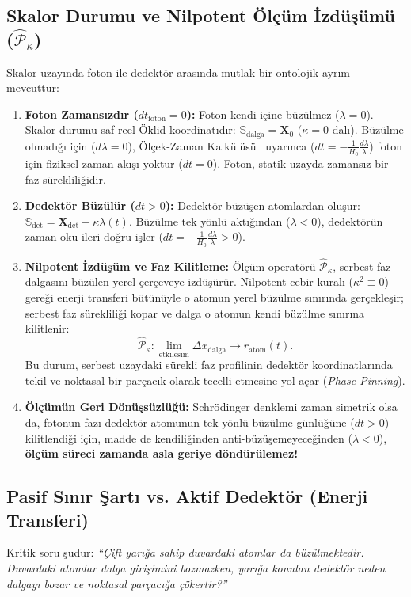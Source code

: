 \documentclass[11pt,a4paper]{article}
\begin{document}
\subsection{Skalor Durumu ve Nilpotent Ölçüm İzdüşümü (\texorpdfstring{$\hat{\mathcal{P}}_\kappa$}{P_kappa})}
Skalor uzayında foton ile dedektör arasında mutlak bir ontolojik ayrım mevcuttur:
\begin{enumerate}
    \item \textbf{Foton Zamansızdır ($dt_{\mathrm{foton}} = 0$):} Foton kendi içine büzülmez ($\dot{\lambda} = 0$). Skalor durumu saf reel Öklid koordinatıdır: $\mathbb{S}_{\mathrm{dalga}} = \mathbf{X}_0$ ($\kappa = 0$ dalı). Büzülme olmadığı için ($d\lambda = 0$), Ölçek-Zaman Kalkülüsü~\cite{scale_calculus} uyarınca ($dt = -\frac{1}{H_0}\frac{d\lambda}{\lambda}$) foton için fiziksel zaman akışı yoktur ($dt = 0$). Foton, statik uzayda zamansız bir faz sürekliliğidir.
    \item \textbf{Dedektör Büzülür ($dt > 0$):} Dedektör büzüşen atomlardan oluşur: $\mathbb{S}_{\mathrm{det}} = \mathbf{X}_{\mathrm{det}} + \kappa \lambda(t)$. Büzülme tek yönlü aktığından ($\dot{\lambda} < 0$), dedektörün zaman oku ileri doğru işler ($dt = -\frac{1}{H_0}\frac{d\lambda}{\lambda} > 0$).
    \item \textbf{Nilpotent İzdüşüm ve Faz Kilitleme:} Ölçüm operatörü $\hat{\mathcal{P}}_\kappa$, serbest faz dalgasını büzülen yerel çerçeveye izdüşürür. Nilpotent cebir kuralı ($\kappa^2 \equiv 0$) gereği enerji transferi bütünüyle o atomun yerel büzülme sınırında gerçekleşir; serbest faz sürekliliği kopar ve dalga o atomun kendi büzülme sınırına kilitlenir:
          \begin{equation}
              \hat{\mathcal{P}}_\kappa : \lim_{\mathrm{etkilesim}} \Delta x_{\mathrm{dalga}} \to r_{\mathrm{atom}}(t).
              \label{eq:nilpotent_sonum_em}
          \end{equation}
          Bu durum, serbest uzaydaki sürekli faz profilinin dedektör koordinatlarında tekil ve noktasal bir parçacık olarak tecelli etmesine yol açar (\textit{Phase-Pinning}).
    \item \textbf{Ölçümün Geri Dönüşsüzlüğü:} Schrödinger denklemi zaman simetrik olsa da, fotonun fazı dedektör atomunun tek yönlü büzülme günlüğüne ($dt > 0$) kilitlendiği için, madde de kendiliğinden anti-büzüşemeyeceğinden ($\dot{\lambda} < 0$), \textbf{ölçüm süreci zamanda asla geriye döndürülemez!}
\end{enumerate}

\subsection{Pasif Sınır Şartı vs. Aktif Dedektör (Enerji Transferi)}
Kritik soru şudur: \textit{``Çift yarığa sahip duvardaki atomlar da büzülmektedir. Duvardaki atomlar dalga girişimini bozmazken, yarığa konulan dedektör neden dalgayı bozar ve noktasal parçacığa çökertir?''}
\end{document}

